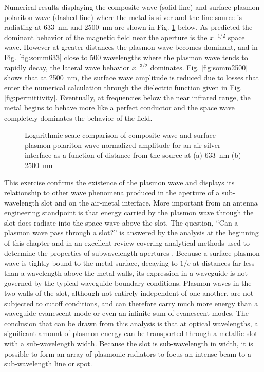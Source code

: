 \documentclass[11pt]{article}
\begin{document}
Numerical results displaying the composite wave (solid line) and surface plasmon polariton wave (dashed line) where the metal is silver and the line source is radiating at \SI{633}{\nm} and \SI{2500}{\nm} are shown in Fig. \ref{fig:sommerfeld} below. As predicted the dominant behavior of the magnetic field near the aperture is the $x^{-1/2}$ space wave. However at greater distances the plasmon wave becomes dominant, and in Fig. \ref{fig:somm633} close to $500$ wavelengths where the plasmon wave tends to rapidly decay, the lateral wave behavior $x^{-3/2}$ dominates. Fig. \ref{fig:somm2500} shows that at \SI{2500}{\nm}, the surface wave amplitude is reduced due to losses that enter the numerical calculation through the dielectric function given in Fig. \ref{fig:permittivity}. Eventually, at frequencies below the near infrared range, the metal begins to behave more like a perfect conductor and the space wave completely dominates the behavior of the field.
%
\begin{figure}[t!]
  \center
   \hfil
  \caption{Logarithmic scale comparison of composite wave and surface plasmon polariton wave normalized amplitude for an air-silver interface as a function of distance from the source at (a) \SI{633}{\nm} (b) \SI{2500}{\nm}}
  \label{fig:sommerfeld}
\end{figure}
%
This exercise confirms the existence of the plasmon wave and displays its relationship to other wave phenomena produced in the aperture of a sub-wavelength slot and on the air-metal interface. More important from an antenna engineering standpoint is that energy carried by the plasmon wave through the slot does radiate into the space wave above the slot. The question, ``Can a plasmon wave pass through a slot?'' is answered by the analysis at the beginning of this chapter and in an excellent review covering analytical methods used to determine the properties of subwavelength apertures \cite{Garcia-Vidal2010}. Because a surface plasmon wave is tightly bound to the metal surface, decaying to $1/e$ at distances far less than a wavelength above the metal walls, its expression in a waveguide is not governed by the typical waveguide boundary conditions. Plasmon waves in the two walls of the slot, although not entirely independent of one another, are not subjected to cutoff conditions, and can therefore carry much more energy than a waveguide evanescent mode or even an infinite sum of evanescent modes. The conclusion that can be drawn from this analysis is that at optical wavelengths, a significant amount of plasmon energy can be transported through a metallic slot with a sub-wavelength width. Because the slot is sub-wavelength in width, it is possible to form an array of plasmonic radiators to focus an intense beam to a sub-wavelength line or spot.
\end{document}
